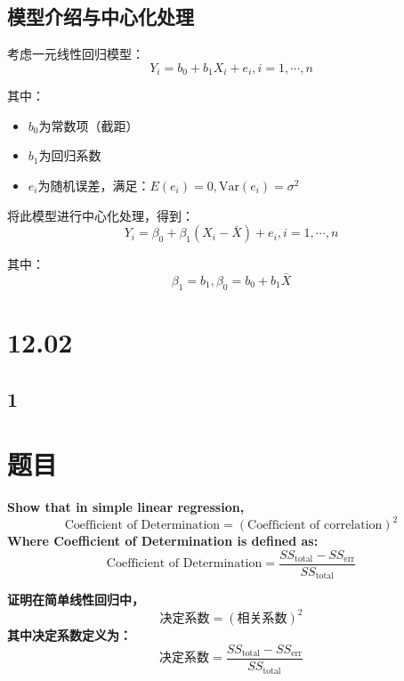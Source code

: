 \documentclass[UTF8]{report}
\theoremstyle{MyLineTheoremStyle} %
\theoremstyle{MyBlockTheoremStyle} %
\theoremstyle{MySubsubsectionStyle} %
\begin{document}
\subsection{模型介绍与中心化处理}

考虑一元线性回归模型：
\[Y_i = b_0 + b_1X_i + e_i, i = 1, \cdots, n\]

其中：
\begin{itemize}
    \item $b_0$为常数项（截距）
    \item $b_1$为回归系数
    \item $e_i$为随机误差，满足：$E(e_i) = 0, \text{Var}(e_i) = \sigma^2$
\end{itemize}

将此模型进行中心化处理，得到：
\[Y_i = \beta_0 + \beta_1(X_i - \bar{X}) + e_i, i = 1, \cdots, n\]

其中：
\[\beta_1 = b_1, \beta_0 = b_0 + b_1\bar{X}\]




\section{12.02}

\subsection{1}

\section*{题目}
\textbf{Show that in simple linear regression,}
\[
\text{Coefficient of Determination} = (\text{Coefficient of correlation})^2
\]
\textbf{Where Coefficient of Determination is defined as:}
\[
\text{Coefficient of Determination} = \frac{SS_{\text{total}} - SS_{\text{err}}}{SS_{\text{total}}}
\]

\textbf{证明在简单线性回归中，}
\[
\text{决定系数} = (\text{相关系数})^2
\]
\textbf{其中决定系数定义为：}
\[
\text{决定系数} = \frac{SS_{\text{total}} - SS_{\text{err}}}{SS_{\text{total}}}
\]
\end{document}
